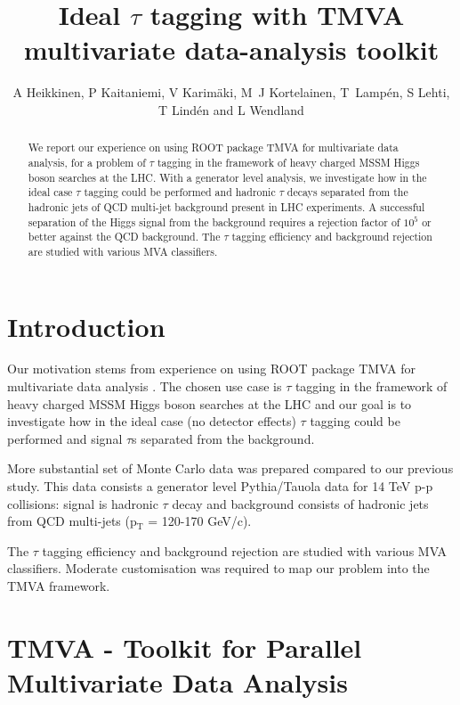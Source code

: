 \documentclass[a4paper]{jpconf}
\begin{document}
\title{Ideal $\tau$ tagging with TMVA multivariate data-analysis toolkit}

\author{A Heikkinen, P Kaitaniemi, V Karim\"{a}ki,
M~J Kortelainen, T~Lamp\'{e}n, S Lehti, T Lind\'{e}n and L Wendland} 

\address{Helsinki Institute of Physics, P.O. Box 64, FIN-00014 University of Helsinki, Finland}



\begin{abstract}
We report our experience on using ROOT package TMVA for
multivariate data analysis, for a problem of $\tau$ tagging in the
framework of heavy charged MSSM Higgs boson searches at the LHC.
With a generator level analysis,
we investigate how in the ideal case $\tau$ tagging could be performed and
hadronic $\tau$ decays separated from the
hadronic jets of QCD multi-jet background present in LHC experiments.
A successful separation of the Higgs signal from the background
requires a rejection factor of $10^5$ or better against the QCD background.
The $\tau$ tagging efficiency and background rejection are studied with various MVA classifiers.
\end{abstract}


\section{Introduction}


Our motivation stems from experience on using ROOT package TMVA for multivariate data analysis
\cite{chep07tmva}.
The chosen use case is $\tau$ tagging in the
framework of heavy charged MSSM Higgs boson searches at the LHC and our
goal is
to investigate how in the ideal case (no detector effects) $\tau$ tagging could be performed and 
signal $\tau$s separated from the background.


More substantial set of Monte Carlo data was prepared compared to our previous study.
This data consists a generator level Pythia/Tauola data for  14 TeV  p-p collisions:
signal is hadronic $\tau$ decay and
background consists of hadronic jets from QCD multi-jets (p$\mathrm{_T}$ = 120-170 GeV/c).


The $\tau$ tagging efficiency and 
background rejection are studied with various MVA classifiers.
Moderate customisation was required to map our problem into the TMVA framework.

\section{TMVA - Toolkit for Parallel Multivariate Data Analysis}
\end{document}
